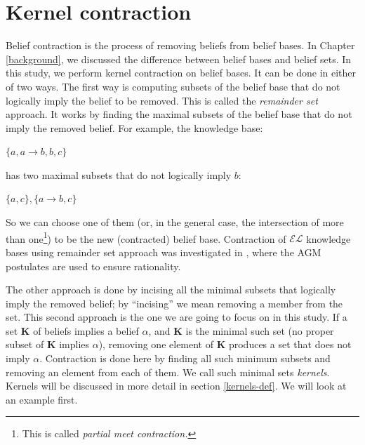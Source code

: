 \chapter{Kernel contraction}
\label{kernel}
Belief contraction is the process of removing beliefs from belief bases. In Chapter \ref{background}, we discussed the difference between belief bases and belief sets. In this study, we perform kernel contraction on belief bases. It can be done in either of two ways. The first way is computing subsets of the belief base that do not logically imply the belief to be removed. This is called the \textit{remainder set} approach. It works by finding the maximal subsets of the belief base that do not imply the removed belief. For example, the knowledge base:
\begin{center}
$\lbrace a, a \rightarrow b, b, c \rbrace$
\end{center}
has two maximal subsets that do not logically imply $b$:
\begin{center}
$\lbrace a, c\rbrace, \lbrace a \rightarrow b, c\rbrace$
\end{center}
So we can choose one of them (or, in the general case, the intersection of more than one\footnote{This is called \textit{partial meet contraction.}}) to be the new (contracted) belief base. Contraction of $\mathcal{EL}$ knowledge bases using remainder set approach was investigated in \cite{remainder}, where the AGM postulates are used to ensure rationality.


The other approach is done by incising all the minimal subsets that logically imply the removed belief; by ``incising'' we mean removing a member from the set. This second approach is the one we are going to focus on in this study. If a set \textbf{K} of beliefs implies a belief $\alpha$, and \textbf{K} is the minimal such set (no proper subset of \textbf{K} implies $\alpha$), removing one element of \textbf{K} produces a set that does not imply $\alpha$. Contraction is done here by finding all such minimum subsets and removing an element from each of them. We call such minimal sets \textit{kernels}. Kernels will be discussed in more detail in section \ref{kernels-def}. We will look at an example first.

